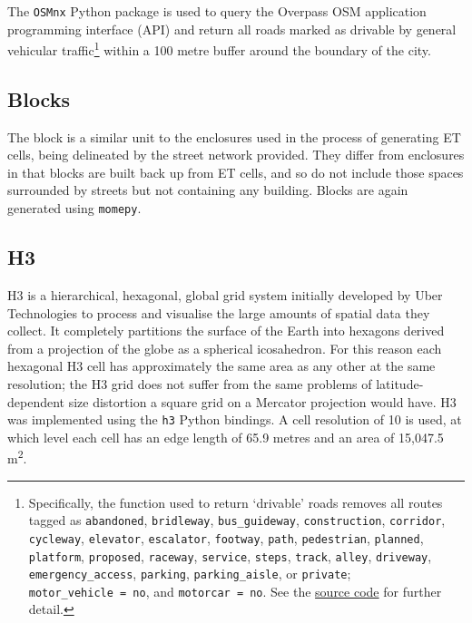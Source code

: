 \documentclass[a4paper, nobind]{templates/ociamthesis}
\begin{document}
The \texttt{OSMnx} Python package \citep{boeing2017} is used to query the Overpass OSM application programming interface (API) and return all roads marked as drivable by general vehicular traffic\footnote{Specifically, the function used to return `drivable' roads removes all routes tagged as \texttt{abandoned}, \texttt{bridleway}, \texttt{bus\_guideway}, \texttt{construction}, \texttt{corridor}, \texttt{cycleway}, \texttt{elevator}, \texttt{escalator}, \texttt{footway}, \texttt{path}, \texttt{pedestrian}, \texttt{planned}, \texttt{platform}, \texttt{proposed}, \texttt{raceway}, \texttt{service}, \texttt{steps}, \texttt{track}, \texttt{alley}, \texttt{driveway}, \texttt{emergency\_access}, \texttt{parking}, \texttt{parking\_aisle}, or \texttt{private}; \texttt{motor\_vehicle\ =\ no}, and \texttt{motorcar\ =\ no}. See the \href{https://github.com/gboeing/osmnx/blob/c350658302ff513a6534e68da38c5ec71b1b0769/osmnx/downloader.py\#L46-L56}{source code} for further detail.} within a 100 metre buffer around the boundary of the city.

\hypertarget{blocks}{%
\subsection{Blocks}\label{blocks}}

The block is a similar unit to the enclosures used in the process of generating ET cells, being delineated by the street network provided. They differ from enclosures in that blocks are built back up from ET cells, and so do not include those spaces surrounded by streets but not containing any building. Blocks are again generated using \texttt{momepy}.

\hypertarget{h3}{%
\subsection{H3}\label{h3}}

H3 \citep{brodsky2018} is a hierarchical, hexagonal, global grid system initially developed by Uber Technologies to process and visualise the large amounts of spatial data they collect. It completely partitions the surface of the Earth into hexagons derived from a projection of the globe as a spherical icosahedron. For this reason each hexagonal H3 cell has approximately the same area as any other at the same resolution; the H3 grid does not suffer from the same problems of latitude-dependent size distortion a square grid on a Mercator projection would have. H3 was implemented using the \texttt{h3} Python bindings. A cell resolution of 10 is used, at which level each cell has an edge length of 65.9 metres and an area of 15,047.5 m\textsuperscript{2}.
\end{document}
